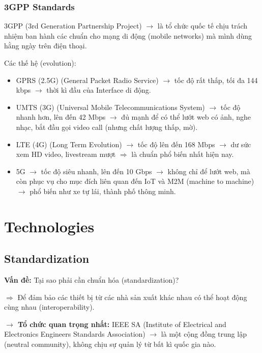 \subsubsection{3GPP Standards}

\noindent
3GPP (3rd Generation Partnership Project) $\rightarrow$ là tổ chức quốc tế chịu trách nhiệm ban hành các chuẩn cho mạng di động (mobile networks) mà mình dùng hằng ngày trên điện thoại.
\medskip

\noindent
Các thế hệ (evolution):

\begin{itemize}
    \item GPRS (2.5G) (General Packet Radio Service) $\rightarrow$ tốc độ rất thấp, tối đa 144 kbps $\rightarrow$ thời kì đầu của Interface di động.
    \item UMTS (3G) (Universal Mobile Telecommunications System) $\rightarrow$ tốc độ nhanh hơn, lên đến 42 Mbps $\rightarrow$ đủ mạnh để có thể lướt web có ảnh, nghe nhạc, bắt đầu gọi video call (nhưng chất lượng thấp, mờ).
    \item LTE (4G) (Long Term Evolution) $\rightarrow$ tốc độ lên đến 168 Mbps $\rightarrow$ dư sức xem HD video, livestream mượt $\Rightarrow$ là chuẩn phổ biến nhất hiện nay.
    \item 5G $\rightarrow$ tốc độ siêu nhanh, lên đến 10 Gbps $\rightarrow$ không chỉ để lướt web, mà còn phục vụ cho mục đích liên quan đến IoT và M2M (machine to machine) $\rightarrow$ phổ biến như xe tự lái, thành phố thông minh.
\end{itemize}
\medskip

\section{Technologies}

\subsection{Standardization}

\noindent
\textbf{Vấn đề:} Tại sao phải cần chuẩn hóa (standardization)?

$\Rightarrow$ Để đảm bảo các thiết bị từ các nhà sản xuất khác nhau có thể hoạt động cùng nhau (interoperability).
\medskip

\noindent
\textbf{$\rightarrow$ Tổ chức quan trọng nhất:} IEEE SA (Institute of Electrical and Electronics Engineers Standards Association) $\rightarrow$ là một cộng đồng trung lập (neutral community), không chịu sự quản lý từ bất kì quốc gia nào.

